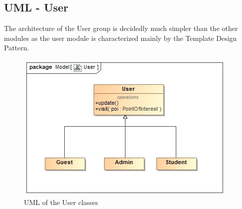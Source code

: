 \documentclass[12pt,a4paper]{article}
\begin{document}
	\subsection{UML - User}
	The architecture of the User group is decidedly much simpler than the other modules as the user module is characterized mainly by the Template Design Pattern.
	\begin{figure}[H]
		\includegraphics[width=\linewidth]{Images/User.jpg}
		\caption{UML of the User classes}
	\end{figure}
	
\end{document}
